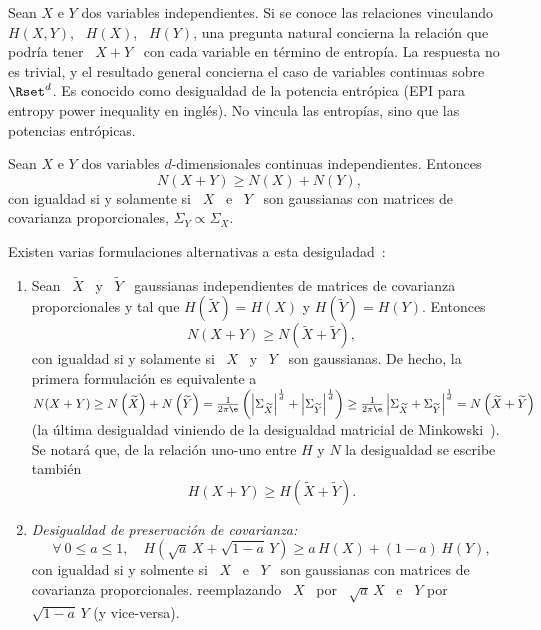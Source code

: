 Sean  $X$ e  $Y$  dos variables  independientes.   Si se  conoce las  relaciones
vinculando \  $H(X,Y)$, \  $H(X)$, \ $H(Y)$,  una pregunta natural  concierna la
relaci\'on  que podr\'ia  tener \  $X+Y$  \ con  cada variable  en t\'ermino  de
entrop\'ia. La respuesta no es trivial, y el resultado general concierna el caso
de  variables continuas  sobre $\Rset^d$.   Es conocido  como desigualdad  de la
potencia entr\'opica (EPI para entropy power inequality en ingl\'es). No vincula
las entrop\'ias, sino que las potencias entr\'opicas.
%
\begin{teorema}\label{Th:SZ:EPI}
  Sean  $X$  e $Y$  dos  variables  $d$-dimensionales continuas  independientes.
  Entonces
  \[
  N(X + Y) \ge N(X) + N(Y),
  \]
%
  con igualdad si y  solamente si \ $X$ \ e \ $Y$  \ son gaussianas con matrices
  de covarianza proporcionales, $\Sigma_Y \propto \Sigma_X$.
\end{teorema}
%
\noindent     Existen    varias     formulaciones     alternativas    a     esta
desiguladad~\cite{Sha48, Lie78, CovTho06, DemCov91, Rio07}:
%
\begin{enumerate}
\item\label{EPI:SZ:EquivGauss} Sean  \ $\widetilde{X}$  \ y \  $\widetilde{Y}$ \
  gaussianas independientes  de matrices de covarianza proporcionales  y tal que
  $H(\widetilde{X}) = H(X)$ y $H(\widetilde{Y}) = H(Y)$.  Entonces
  \[
  N(X+Y) \ge N\left( \widetilde{X} + \widetilde{Y} \right),
  \]
  con igualdad si y solamente si \ $X$  \ y \ $Y$ \ son gaussianas. De hecho, la
  primera  formulaci\'on  es equivalente  a  $N(X+Y)  \ge N\left(  \widetilde{X}
  \right) +  N\left( \widetilde{Y}  \right) = \frac{1}{2  \pi \e}  \left( \left|
      \Sigma_{\widetilde{X}}  \right|^{\frac1d} +  \left| \Sigma_{\widetilde{Y}}
    \right|^{\frac1d}     \right)    \ge     \frac{1}{2    \pi     \e}    \left|
    \Sigma_{\widetilde{X}} +  \Sigma_{\widetilde{Y}} \right|^{\frac1d} = N\left(
    \widetilde{X} + \widetilde{Y} \right)$  (la \'ultima desigualdad viniendo de
  la  desigualdad matricial de  Minkowski~\cite{HarLit52, Min10}).   Se notar\'a
  que,  de la  relaci\'on uno-uno  entre  $H$ y  $N$ la  desigualdad se  escribe
  tambi\'en \[ H(X+Y) \ge H\left( \widetilde{X} + \widetilde{Y} \right).\]
%
\item\label{EPI:SZ:PresCov}    {\it    Desigualdad    de    preservaci\'on    de
    covarianza:}
  \[
  \forall  \:   0  \le  a  \le   1,  \quad  H\left(   \sqrt{a} \, X  +
    \sqrt{1-a} \, Y \right) \ge a \, H(X) + (1-a) \, H(Y),
  \]
  con igualdad si y solmente si \ $X$ \ e \ $Y$ \ son gaussianas con matrices de
  covarianza proporcionales.    reemplazando \ $X$ \ por \
  $\sqrt{a} \, X$ \ e \ $Y$ por \ $\sqrt{1-a} \, Y$ (y vice-versa).
\end{enumerate}
